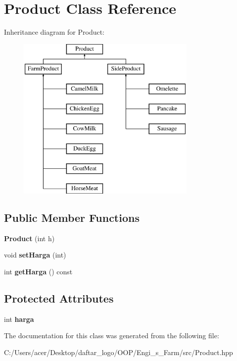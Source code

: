 \hypertarget{class_product}{}\section{Product Class Reference}
\label{class_product}
Inheritance diagram for Product\+:\begin{figure}[H]
\begin{center}
\leavevmode
\includegraphics[height=8.000000cm]{class_product}
\end{center}
\end{figure}
\subsection*{Public Member Functions}
\begin{DoxyCompactItemize}
\item 
\mbox{\label{class_product_a4e48c96db94f1a241f7b0ba57d07a295}} 
{\bfseries Product} (int h)
\item 
\mbox{\label{class_product_aff47f49b6fda50b62965035e02456d3e}} 
void {\bfseries set\+Harga} (int)
\item 
\mbox{\label{class_product_aaaa6866dd9d4e2c6d6f21cffcdd549c3}} 
int {\bfseries get\+Harga} () const
\end{DoxyCompactItemize}
\subsection*{Protected Attributes}
\begin{DoxyCompactItemize}
\item 
\mbox{\label{class_product_a987b9fc5fa69c36fec40d5e77a4cfa51}} 
int {\bfseries harga}
\end{DoxyCompactItemize}


The documentation for this class was generated from the following file\+:\begin{DoxyCompactItemize}
\item 
C\+:/\+Users/acer/\+Desktop/daftar\+\_\+logo/\+O\+O\+P/\+Engi\+\_\+s\+\_\+\+Farm/src/Product.\+hpp\end{DoxyCompactItemize}

